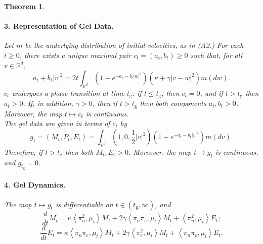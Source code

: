 \documentclass[11pt, notitlepage]{article}
\newtheorem{thm}{Theorem}[section]
\begin{document}
\begin{thm}
\paragraph{\textbf{3. Representation of Gel Data.}} Let $m$ be the underlying distribution of initial velocities, as in ({A2}.) For each $t\ge 0$, there exists a unique maximal pair $c_t=(a_t, b_t) \ge 0$ such that, for all $v\in \mathbb{R}^d$, \begin{equation}\label{eq: NLFP 1} a_t+b_t|v|^2=2t \int_{\mathbb{R}^d} (1-e^{-a_t-b_t|w|^2})(\kappa+\gamma|v-w|^2)m(dw). \end{equation} $c_t$ undergoes a phase transition at time $t_\mathrm{g}$: if $t\le t_\mathrm{g}$, then $c_t=0$, and if $t>t_\mathrm{g}$ then $a_t>0$. If, in addition, $\gamma>0$, then if $t>t_\mathrm{g}$ then both components $a_t, b_t>0$. Moreover, the map $t\mapsto c_t$ is continuous. \medskip \\  The gel data are given in terms of $c_t$ by \begin{equation}\label{eq: formula for M, E_0}
    g_t =(M_t, P_t, E_t)= \int_{\mathbb{R}^d} \left(1,0, \frac{1}{2}|v|^2\right)(1-e^{-a_t-b_t|v|^2})m(dv).
\end{equation} Therefore, if $t>t_\mathrm{g}$ then both $M_t, E_t>0$. Moreover, the map $t\mapsto g_t$ is continuous, and $g_{t_\mathrm{g}}=0$.
\paragraph{\textbf{4. Gel Dynamics.}} The map $t\mapsto g_t$ is differentiable on $t\in(t_\mathrm{g}, \infty)$, and
\begin{equation}
    \frac{d}{dt}M_t=\kappa\left<\pi_n^2,\mu_t\right>M_t +2\gamma 
        \left<\pi_n \pi_e,\mu_t \right>M_t +
        \left<\pi_n^2,\mu_t \right>E_t ;
\end{equation}
\begin{equation}
    \frac{d}{dt}E_t=
      \kappa \left<\pi_n \pi_e,\mu_t\right>M_t +
      2\gamma 
        \left<\pi_e^2,\mu_t \right>M_t +
        \left<\pi_n \pi_e,\mu_t \right>E_t.
\end{equation}

\end{thm}
\end{document}
